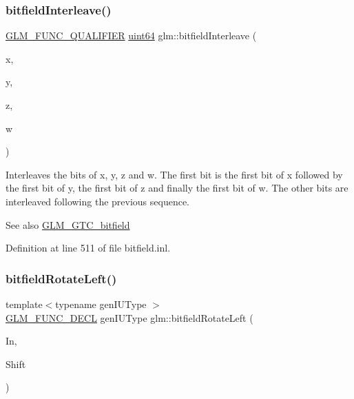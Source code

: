 \subsubsection{\texorpdfstring{bitfieldInterleave()}{bitfieldInterleave()}\hspace{0.1cm}{\footnotesize\ttfamily [16/16]}}
{\footnotesize\ttfamily \mbox{\hyperlink{setup_8hpp_a33fdea6f91c5f834105f7415e2a64407}{G\+L\+M\+\_\+\+F\+U\+N\+C\+\_\+\+Q\+U\+A\+L\+I\+F\+I\+ER}} \mbox{\hyperlink{group__gtc__type__precision_gae3632bf9b37da66233d78930dd06378a}{uint64}} glm\+::bitfield\+Interleave (\begin{DoxyParamCaption}\item[{\mbox{\hyperlink{group__gtc__type__precision_gad8c2939e1fdd8e5828b31d95c52255d5}{uint16}}}]{x,  }\item[{\mbox{\hyperlink{group__gtc__type__precision_gad8c2939e1fdd8e5828b31d95c52255d5}{uint16}}}]{y,  }\item[{\mbox{\hyperlink{group__gtc__type__precision_gad8c2939e1fdd8e5828b31d95c52255d5}{uint16}}}]{z,  }\item[{\mbox{\hyperlink{group__gtc__type__precision_gad8c2939e1fdd8e5828b31d95c52255d5}{uint16}}}]{w }\end{DoxyParamCaption})}

Interleaves the bits of x, y, z and w. The first bit is the first bit of x followed by the first bit of y, the first bit of z and finally the first bit of w. The other bits are interleaved following the previous sequence.

\begin{DoxySeeAlso}{See also}
\mbox{\hyperlink{group__gtc__bitfield}{G\+L\+M\+\_\+\+G\+T\+C\+\_\+bitfield}} 
\end{DoxySeeAlso}


Definition at line 511 of file bitfield.\+inl.

\mbox{\label{group__gtc__bitfield_ga2eb49678a344ce1495bdb5586d9896b9}} 
\subsubsection{\texorpdfstring{bitfieldRotateLeft()}{bitfieldRotateLeft()}\hspace{0.1cm}{\footnotesize\ttfamily [1/2]}}
{\footnotesize\ttfamily template$<$typename gen\+I\+U\+Type $>$ \\
\mbox{\hyperlink{setup_8hpp_ab2d052de21a70539923e9bcbf6e83a51}{G\+L\+M\+\_\+\+F\+U\+N\+C\+\_\+\+D\+E\+CL}} gen\+I\+U\+Type glm\+::bitfield\+Rotate\+Left (\begin{DoxyParamCaption}\item[{gen\+I\+U\+Type}]{In,  }\item[{int}]{Shift }\end{DoxyParamCaption})}

